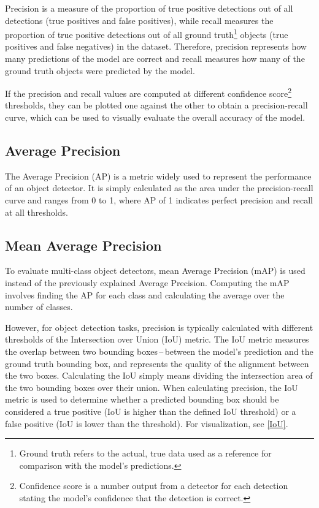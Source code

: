 Precision is a measure of the proportion of true positive detections out of all
detections (true positives and false positives), while recall measures the
proportion of true positive detections out of all ground truth\footnote{Ground
truth refers to the actual, true data used as a reference for comparison with
the model's predictions.} objects (true positives and false negatives) in the
dataset. Therefore, precision represents how many predictions of the model are
correct and recall measures how many of the ground truth objects were predicted
by the model.

If the precision and recall values are computed at different confidence
score\footnote{Confidence score is a number output from a detector for each
detection stating the model's confidence that the detection is correct.}
thresholds, they can be plotted one against the other to obtain a
precision-recall curve, which can be used to visually evaluate the overall
accuracy of the model.

\subsection*{Average Precision}

The Average Precision (AP) is a metric widely used to represent the performance
of an object detector. It is simply calculated as the area under the
precision-recall curve and ranges from 0 to 1, where AP of 1 indicates perfect
precision and recall at all thresholds.

\subsection*{Mean Average Precision}

To evaluate multi-class object detectors, mean Average Precision (mAP) is used
instead of the previously explained Average Precision. Computing the mAP
involves finding the AP for each class and calculating the average over the
number of classes.

However, for object detection tasks, precision is typically calculated with
different thresholds of the Intersection over Union (IoU) metric. The IoU metric
measures the overlap between two bounding boxes\,--\,between the model's
prediction and the ground truth bounding box, and represents the quality of the
alignment between the two boxes. Calculating the IoU simply means dividing the
intersection area of the two bounding boxes over their union. When calculating
precision, the IoU metric is used to determine whether a predicted bounding box
should be considered a true positive (IoU is higher than the defined IoU
threshold) or a false positive (IoU is lower than the threshold). For
visualization, see \autoref{IoU}.

